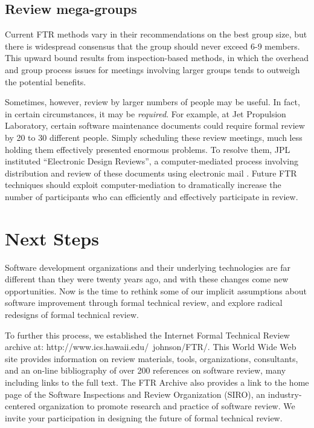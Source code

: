 \subsection*{Review mega-groups}

Current FTR methods vary in their recommendations on the best group size,
but there is widespread consensus that the group should never exceed 6-9
members. This upward bound results from inspection-based methods, in which
the overhead and group process issues for meetings involving larger groups
tends to outweigh the potential benefits.

Sometimes, however, review by larger numbers of people may be useful.  In
fact, in certain circumstances, it may be {\em required}.  For example, at
Jet Propulsion Laboratory, certain software maintenance documents could
require formal review by 20 to 30 different people.  Simply
scheduling these review meetings, much less holding them effectively
presented enormous problems.  To resolve them, JPL instituted ``Electronic
Design Reviews'', a computer-mediated process involving distribution and
review of these documents using electronic mail  \cite{Kierk93}.  Future 
FTR techniques should exploit computer-mediation to dramatically increase
the number of participants who can efficiently and effectively participate
in review. 


\section*{Next Steps}

Software development organizations and their underlying technologies are
far different than they were twenty years ago, and with these changes come
new opportunities.  Now is the time to rethink some of our implicit assumptions
about software improvement through formal technical review, and explore
radical redesigns of formal technical review. 

To further this process, we established the Internet Formal Technical
Review archive at: 
http://www.ics.hawaii.edu/~johnson/FTR/. 
This World Wide
Web site provides information on review materials, tools, organizations,
consultants, and an on-line bibliography of over 200 references on software
review, many including links to the full text.  The FTR Archive also
provides a link to the home page of the Software Inspections and Review
Organization (SIRO), an industry-centered organization to promote research
and practice of software review.  We invite your participation in 
designing the future of formal technical review. 





     



